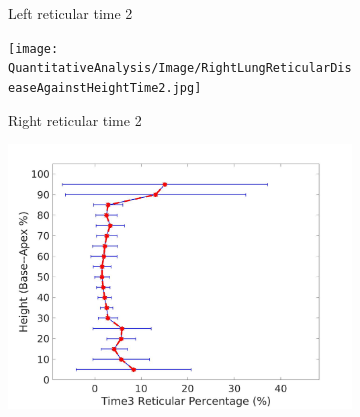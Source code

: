 \begin{figure}[H]
\begin{subfigure}{.41\linewidth}
  \caption{Left reticular time 2}
  \label{fig:DiseaseAgainstHeightOverTime2-c} 
\end{subfigure} 
\begin{subfigure}{.41\linewidth}%
  \texttt{[image: QuantitativeAnalysis/Image/RightLungReticularDiseaseAgainstHeightTime2.jpg]}
  \caption{Right reticular time 2}
  \label{fig:DiseaseAgainstHeightOverTime2-d}
\end{subfigure}
\begin{subfigure}{.41\linewidth}%
  \includegraphics[width=\linewidth,trim={{.0\wd0} {.0\wd0} {.0\wd0} {.0\wd0}},clip]{QuantitativeAnalysis/Image/LeftLungReticularDiseaseAgainstHeightTime3.jpg} %

\end{subfigure}
\end{figure}
